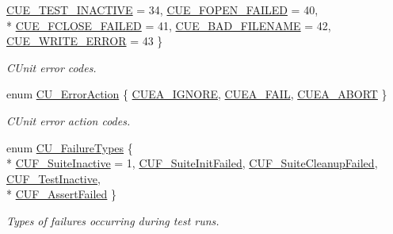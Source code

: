 \begin{DoxyCompactItemize}
\hyperlink{group__Framework_gga743a2a025ee3eb792d7d85f0eea347e6a85ed914f60c8a688e3a1b2047d559811}{C\-U\-E\-\_\-\-T\-E\-S\-T\-\_\-\-I\-N\-A\-C\-T\-I\-V\-E} =  34, 
\hyperlink{group__Framework_gga743a2a025ee3eb792d7d85f0eea347e6abd6a84f6bed1373048d3ae8b66897435}{C\-U\-E\-\_\-\-F\-O\-P\-E\-N\-\_\-\-F\-A\-I\-L\-E\-D} =  40, 
\\*
\hyperlink{group__Framework_gga743a2a025ee3eb792d7d85f0eea347e6aae17fe401deb6eaa939b12e063c564db}{C\-U\-E\-\_\-\-F\-C\-L\-O\-S\-E\-\_\-\-F\-A\-I\-L\-E\-D} =  41, 
\hyperlink{group__Framework_gga743a2a025ee3eb792d7d85f0eea347e6ad8d21285b78e3f1c8a5dfde54bce4a68}{C\-U\-E\-\_\-\-B\-A\-D\-\_\-\-F\-I\-L\-E\-N\-A\-M\-E} =  42, 
\hyperlink{group__Framework_gga743a2a025ee3eb792d7d85f0eea347e6ae5246e226eba26a7d746c6db5b523cee}{C\-U\-E\-\_\-\-W\-R\-I\-T\-E\-\_\-\-E\-R\-R\-O\-R} =  43
 \}
\begin{DoxyCompactList}\small\item\em C\-Unit error codes. \end{DoxyCompactList}\item 
enum \hyperlink{group__Framework_ga50053b4edbfc96a88027dd57c580ca35}{C\-U\-\_\-\-Error\-Action} \{ \hyperlink{group__Framework_gga50053b4edbfc96a88027dd57c580ca35a8d128d9f1ef78818816d62dd5d0a7043}{C\-U\-E\-A\-\_\-\-I\-G\-N\-O\-R\-E}, 
\hyperlink{group__Framework_gga50053b4edbfc96a88027dd57c580ca35a88e2ea08ccaf759fdd948051b0c156a7}{C\-U\-E\-A\-\_\-\-F\-A\-I\-L}, 
\hyperlink{group__Framework_gga50053b4edbfc96a88027dd57c580ca35a5356f9f4514df11bc7543ac8ea71d66b}{C\-U\-E\-A\-\_\-\-A\-B\-O\-R\-T}
 \}
\begin{DoxyCompactList}\small\item\em C\-Unit error action codes. \end{DoxyCompactList}\item 
enum \hyperlink{group__Framework_gaea9b4c74f76417ce586bd5e6196f2f27}{C\-U\-\_\-\-Failure\-Types} \{ \\*
\hyperlink{group__Framework_ggaea9b4c74f76417ce586bd5e6196f2f27a1e184e2801046e43ebfdea03a493019e}{C\-U\-F\-\_\-\-Suite\-Inactive} =  1, 
\hyperlink{group__Framework_ggaea9b4c74f76417ce586bd5e6196f2f27abfb0f259240a2ed8f148d979692d2090}{C\-U\-F\-\_\-\-Suite\-Init\-Failed}, 
\hyperlink{group__Framework_ggaea9b4c74f76417ce586bd5e6196f2f27afb4f2d54661c29294303303d3b155f5e}{C\-U\-F\-\_\-\-Suite\-Cleanup\-Failed}, 
\hyperlink{group__Framework_ggaea9b4c74f76417ce586bd5e6196f2f27afce0c432f6c2d7c60da89a5fcabfb389}{C\-U\-F\-\_\-\-Test\-Inactive}, 
\\*
\hyperlink{group__Framework_ggaea9b4c74f76417ce586bd5e6196f2f27ab2f58bdfd85f572866182be14b9ac482}{C\-U\-F\-\_\-\-Assert\-Failed}
 \}
\begin{DoxyCompactList}\small\item\em Types of failures occurring during test runs. \end{DoxyCompactList}\end{DoxyCompactItemize}
